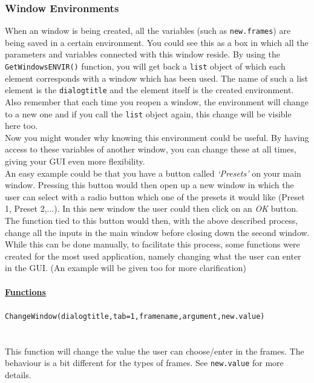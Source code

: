 \documentclass[a4paper]{article}\usepackage[]{graphicx}\usepackage[]{color}
\begin{document}
\subsubsection{Window Environments}
\noindent When an window is being created, all the variables (such as
\verb|new.frames|) are being saved in a certain environment. You could see this
as a box in which all the parameters and variables connected with this window
reside. By using the \verb|GetWindowsENVIR()| function, you will get back a
\verb|list| object of which each element corresponds with a window which has
been used. The name of such a list element is the \verb|dialogtitle| and the
element itself is the created environment. Also remember that each time you
reopen a window, the environment will change to a new one and if you call the
\verb|list| object again, this change will be visible here too.\\
Now you might wonder why knowing this environment could be useful. By having
access to these variables of another window, you can change these at all times,
giving your GUI even more flexibility.\\
An easy example could be that you have a button called {\it `Presets'} on your
main window. Pressing this button would then open up a new window in which the
user can select with a radio button which one of the presets it would like
(Preset 1, Preset 2,...). In this new window the user could then click on an
{\it OK} button. The function tied to this button would then, with the above
described process, change all the inputs in the main window before closing down
the second window.
\\
While this can be done manually, to facilitate this process, some functions were
created for the most used application, namely changing what the user can enter
in the GUI. (An example will be given too for more clarification)
\\ \\
{\bf \underline{Functions}}
\\ \\
\noindent \verb|ChangeWindow(dialogtitle,tab=1,framename,argument,new.value)|
\\ \\
\\
\noindent This function will change the value the user can choose/enter in the
frames. The behaviour is a bit different for the types of frames. See
\verb|new.value| for more details.
\end{document}
